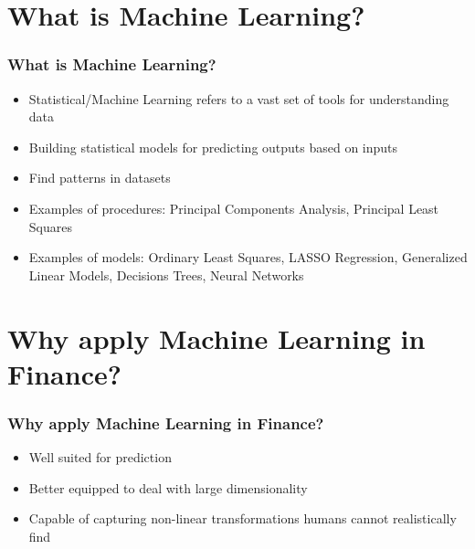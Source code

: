 \documentclass[]{beamer}
\begin{document}
\section{What is Machine Learning?}


\begin{frame}
\frametitle{What is Machine Learning?}
\begin{itemize}
	\item Statistical/Machine Learning refers to a vast set of tools for understanding data
	\item Building statistical models for predicting outputs based on inputs
	\item Find patterns in datasets
	\item Examples of procedures: Principal Components Analysis, Principal Least Squares
	\item Examples of models: Ordinary Least Squares, LASSO Regression, Generalized Linear Models, Decisions Trees, Neural Networks
\end{itemize}
\end{frame}

\section{Why apply Machine Learning in Finance?}


\begin{frame}
\frametitle{Why apply Machine Learning in Finance?}
\begin{itemize}
	\item Well suited for prediction
	\item Better equipped to deal with large dimensionality
	\item Capable of capturing non-linear transformations humans cannot realistically find
\end{itemize}
\end{frame}
\end{document}
